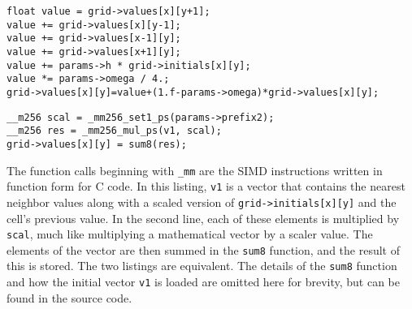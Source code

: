 \vspace{5mm}

\begin{minipage}{\linewidth}
\begin{lstlisting}[frame=single,label=lst:normal,caption={Iteration code (simplified) for a single cell. Also notice that this code uses structure-of-arrays data layout.}]
float value = grid->values[x][y+1];
value += grid->values[x][y-1];
value += grid->values[x-1][y];
value += grid->values[x+1][y];
value += params->h * grid->initials[x][y];
value *= params->omega / 4.;
grid->values[x][y]=value+(1.f-params->omega)*grid->values[x][y];
\end{lstlisting}
\end{minipage}

\begin{minipage}{\linewidth}
\begin{lstlisting}[frame=single,label=lst:normal,caption={SIMD version of iteration code for a single cell. The loading of the initial vector is not shown for simplicity.}]
__m256 scal = _mm256_set1_ps(params->prefix2);
__m256 res = _mm256_mul_ps(v1, scal);
grid->values[x][y] = sum8(res);
\end{lstlisting}
\end{minipage}

The function calls beginning with \texttt{\_mm} are the SIMD instructions written in function form for C code. In this listing, \texttt{v1} is a vector that contains
the nearest neighbor values along with a scaled version of \texttt{grid->initials[x][y]} and the cell's previous value. In the second line, each of these elements is
multiplied by \texttt{scal}, much like multiplying a mathematical vector by a scaler value. The elements of the vector are then summed in the \texttt{sum8} function,
and the result of this is stored. The two listings are equivalent. The details of the \texttt{sum8} function and how the initial vector \texttt{v1} is loaded are
omitted here for brevity, but can be found in the source code.

